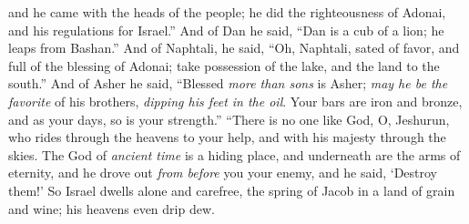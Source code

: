 \begin{biblechapter}
and he came with the heads of the people; 
he did the righteousness of Adonai, 
and his regulations for Israel.”
\verse And of Dan he said, 
“Dan is a cub of a lion; 
he leaps from Bashan.”
\verse And of Naphtali, he said, 
“Oh, Naphtali, sated of favor, 
and full of the blessing of Adonai; 
take possession of the lake, 
and the land to the south.”
\verse And of Asher he said, 
“Blessed \textit{more than sons} is Asher; 
\textit{may he be the favorite} of his brothers, 
\textit{dipping his feet in the oil}.
\verse Your bars are iron and bronze, 
and as your days, so is your strength.”
\verse “There is no one like God, O, Jeshurun, 
who rides through the heavens to your help, 
and with his majesty through the skies.
\verse The God of \textit{ancient time} is a hiding place, 
and underneath are the arms of eternity, 
and he drove out \textit{from before} you your enemy, 
and he said, ‘Destroy them!’
\verse So Israel dwells alone and carefree, 
the spring of Jacob in a land of grain and wine; 
his heavens even drip dew.
\end{biblechapter}

